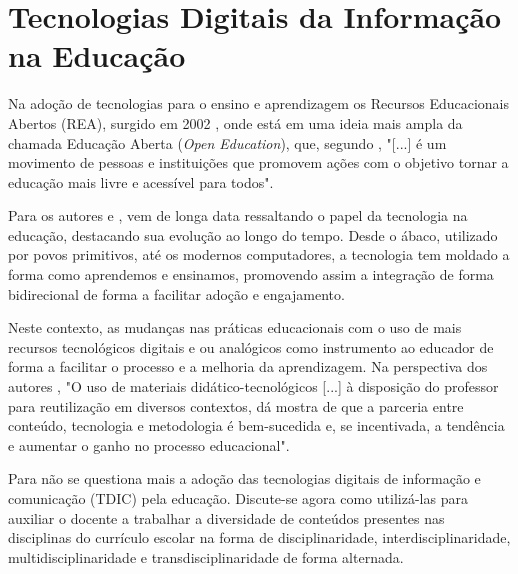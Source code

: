 






\section{Tecnologias Digitais da Informação na Educação}
\label{tics_educacao}


Na adoção de tecnologias para o ensino e aprendizagem os Recursos Educacionais Abertos (REA), surgido em 2002 \cite{unesco2020}, onde está em uma ideia mais ampla da chamada Educação Aberta (\textit{Open Education}), que, segundo , "[...]  é um movimento de pessoas e instituições que promovem ações com o objetivo tornar a educação mais livre e acessível para todos".

Para os autores  e , vem de longa data ressaltando o papel da tecnologia na educação, destacando sua evolução ao longo do tempo. Desde o ábaco, utilizado por povos primitivos, até os modernos computadores, a tecnologia tem moldado a forma como aprendemos e ensinamos, promovendo assim a integração de forma bidirecional de forma a facilitar adoção e engajamento.

Neste contexto, as mudanças nas práticas educacionais com o uso de mais recursos tecnológicos digitais e ou analógicos como instrumento ao educador de forma a facilitar o processo e a melhoria da aprendizagem. Na perspectiva dos autores , "O uso de materiais didático-tecnológicos [...] à disposição do professor para reutilização em diversos contextos, dá mostra de que a parceria entre conteúdo, tecnologia e metodologia é bem-sucedida e, se incentivada, a tendência e aumentar o ganho no processo educacional".



Para 
não se questiona mais a adoção das tecnologias digitais de informação e comunicação (TDIC) pela educação. Discute-se agora como utilizá-las para auxiliar o docente a trabalhar a diversidade de conteúdos presentes nas disciplinas do currículo escolar na forma de disciplinaridade, interdisciplinaridade, multidisciplinaridade e transdisciplinaridade de forma alternada.

